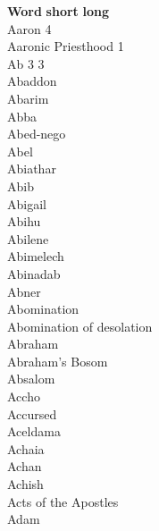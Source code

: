 

\noindent
\textbf{Word}  \hfill \textbf{short} \quad \textbf{long}\\
Aaron \hfill 4 \\
Aaronic Priesthood \hfill 1 \\
Ab \hfill 3 \quad \phantom{00}3\\
Abaddon  \\
Abarim  \\
Abba  \\
Abed-nego  \\
Abel  \\
Abiathar  \\
Abib  \\
Abigail  \\
Abihu  \\
Abilene  \\
Abimelech  \\
Abinadab  \\
Abner  \\
Abomination  \\
Abomination of desolation  \\
Abraham  \\
Abraham’s Bosom  \\
Absalom  \\
Accho  \\
Accursed  \\
Aceldama  \\
Achaia  \\
Achan  \\
Achish  \\
Acts of the Apostles  \\
Adam  \\
